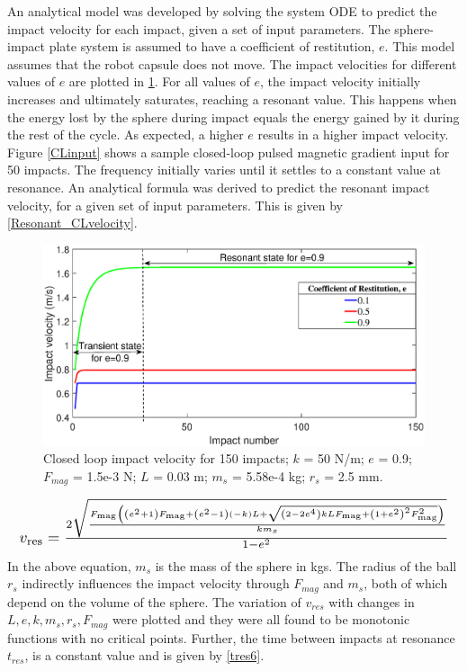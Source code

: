 \documentclass[letterpaper, 10 pt, conference]{ieeeconf}  %
\begin{document}
An analytical model was developed by solving the system ODE to predict the impact velocity for each impact, given a set of input parameters. The sphere-impact plate system is assumed to have a coefficient of restitution, $e$. This model assumes that the robot capsule does not move. The impact velocities for different values of $e$ are plotted in \cref{Closedloop_Impact_velocity}.
For all values of $e$, the impact velocity initially increases and ultimately saturates, reaching a resonant value. This happens when the energy lost by the sphere during impact equals the energy gained by it during the rest of the cycle. As expected, a higher $e$ results in a higher impact velocity. Figure \ref{CLinput} shows a sample closed-loop pulsed magnetic gradient input for 50 impacts. The frequency initially varies until it settles to a constant value at resonance. An analytical formula was derived to predict the resonant impact velocity, for a given set of input parameters. This is given by \cref{Resonant_CLvelocity}.
\begin{figure}
	\includegraphics[width=\linewidth]{Closedloop_Impact_velocity.eps}
	\caption{Closed loop impact velocity for 150 impacts; $k$ = 50 N/m; $e$ = 0.9; $F_{mag}$ = 1.5e-3 N; $L$ = 0.03 m; $m_s$ = 5.58e-4 kg; $r_s$ = 2.5 mm.}
	\label{Closedloop_Impact_velocity}
	
\end{figure}
\begin{equation}
\resizebox{\linewidth}{!}
{$
	v_{\text{res}}=\frac{2 \sqrt{\frac{F_{\text{mag}} \left(\left(e^2+1\right) F_{\text{mag}}+\left(e^2-1\right) (-k) L+\sqrt{\left(2-2 e^4\right) k L F_{\text{mag}}+\left(1+e^2\right)^2 F_{\text{mag}}^2}\right)}{k m_s}}}{1-e^2}
	$}
\label{Resonant_CLvelocity}
\end{equation}
In the above equation, $m_s$ is the mass of the sphere in kgs. The radius of the ball $r_s$ indirectly influences the impact velocity through $F_{mag}$ and $m_s$, both of which depend on the volume of the sphere. The variation of $v_{res}$ with changes in $L,e,k,m_s,r_s,F_{mag}$ were plotted and they were all found to be monotonic functions with no critical points. Further, the time between impacts at resonance $t_{res}$, is a constant value and is given by \cref{tres6}.
\end{document}
